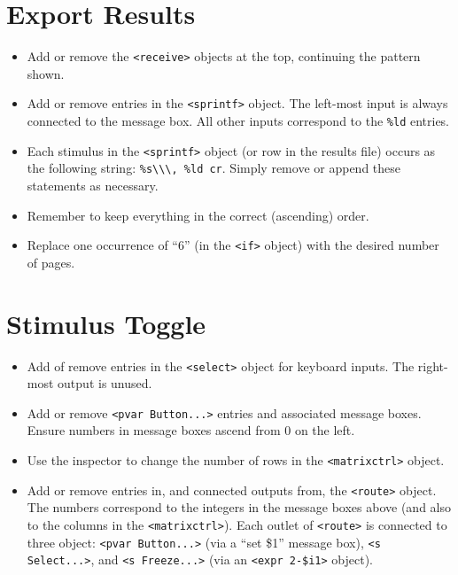 \documentclass[10pt]{article}
\begin{document}
\section{Export Results}
\begin{itemize}
\item Add or remove the \verb|<receive>| objects at the top, continuing the pattern shown.
\item Add or remove entries in the \verb|<sprintf>| object. The left-most input is always connected to the message box. All other inputs correspond to the \verb|%ld| entries.
\item Each stimulus in the \verb|<sprintf>| object (or row in the results file) occurs as the following string: \verb|%s\\\, %ld cr|. Simply remove or append these statements as necessary.
\item  Remember to keep everything in the correct (ascending) order.
\item Replace one occurrence of ``6'' (in the \verb|<if>| object) with the desired number of pages.
\end{itemize}

\section{Stimulus Toggle}
\begin{itemize}
\item Add of remove entries in the \verb|<select>| object for keyboard inputs. The right-most output is unused.
\item Add or remove \verb|<pvar Button...>| entries and associated message boxes. Ensure numbers in message boxes ascend from 0 on the left.
\item Use the inspector to change the number of rows in the \verb|<matrixctrl>| object.
\item Add or remove entries in, and connected outputs from, the \verb|<route>| object. The numbers correspond to the integers in the message boxes above (and also to the columns in the \verb|<matrixctrl>|). Each outlet of \verb|<route>| is connected to three object: \verb|<pvar Button...>| (via a ``set \$1'' message box), \verb|<s Select...>|, and \verb|<s Freeze...>| (via an \verb|<expr 2-$i1>| object).
\end{itemize}
\end{document}
